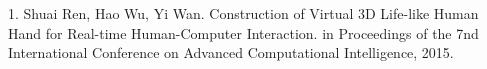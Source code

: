 \begin{publications}{99}

\item 1. Shuai Ren, Hao Wu, Yi Wan. Construction of Virtual 3D Life-like
  Human Hand for Real-time Human-Computer Interaction. in Proceedings of
  the 7nd International Conference on Advanced Computational Intelligence,
  2015.

\end{publications}

